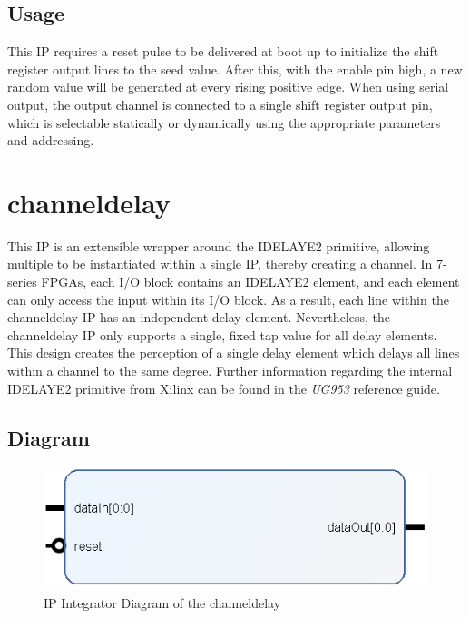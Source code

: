 \documentclass[11pt]{article}
\begin{document}
\subsection{Usage}
This IP requires a reset pulse to be delivered at boot up to initialize the shift register output lines to the seed value. After this, with the enable pin
high, a new random value will be generated at every rising positive edge. When using serial output, the output channel is connected to a single shift
register output pin, which is selectable statically or dynamically using the appropriate parameters and addressing.

\section{channel\textunderscore delay}
This IP is an extensible wrapper around the IDELAYE2 primitive, allowing multiple to be instantiated within a single IP, thereby creating a channel. In
7-series FPGAs, each I/O block contains an IDELAYE2 element, and each element can only access the input within its I/O block. As a result, each line
within the channel\textunderscore delay IP has an independent delay element. Nevertheless, the channel\textunderscore delay IP only supports a single,
fixed tap value for all delay elements. This design creates the perception of a single delay element which delays all lines within a channel to the same
degree. 
Further information regarding the internal IDELAYE2 primitive from Xilinx can be found in the \textit{UG953} reference guide.
\subsection{Diagram}
\begin{figure}[h!]
	\label{fig:channel_delay}
	\centering
	\includegraphics[width=0.6\linewidth]{images/channel_delay}
	\caption{IP Integrator Diagram of the channel\textunderscore delay}
\end{figure}
\end{document}
